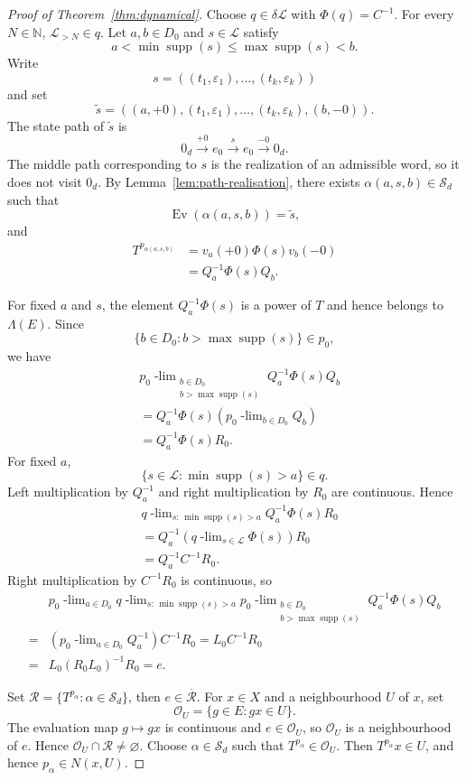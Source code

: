 \documentclass[10pt,a4paper]{amsart}
\newcommand{\N}{\mathbb N}
\newcommand{\Sd}{\mathcal S_d}
\newcommand{\cL}{\mathcal L}
\newcommand{\supp}{\operatorname{supp}}
\newcommand{\ulim}[2]{#1\!\operatorname{-lim}_{#2}}
\begin{document}
\begin{proof}[Proof of Theorem~\ref{thm:dynamical}]
Choose $q\in\delta\cL$ with $\Phi(q)=C^{-1}$.
For every $N\in\N$, $\cL_{>N}\in q$.
Let $a,b\in D_0$ and $s\in\cL$ satisfy
\[
 a<\min\supp(s)\leq\max\supp(s)<b.
\]
Write  
\[
 s=((t_1,\varepsilon_1),\ldots,(t_k,\varepsilon_k))
\]
and set
\[
 \widetilde s
 =((a,+0),(t_1,\varepsilon_1),\ldots,(t_k,\varepsilon_k),(b,-0)).
\]
The state path of $\widetilde s$ is
\[
 0_d \xrightarrow{+0} e_0 \xrightarrow{s} e_0\xrightarrow{-0} 0_d.
\]
The middle path corresponding to $s$ is the realization of an admissible word, so it does not visit $0_d$.
By Lemma~\ref{lem:path-realisation}, there exists $ \alpha(a,s,b) \in \Sd$  such that 
\[
 \operatorname{Ev}( \alpha(a,s,b))=\widetilde s,
\]
and
\[
 \begin{aligned}
 T^{p_{ \alpha(a,s,b) }}
 &=v_a(+0)\Phi(s)v_b(-0)\\
 &=Q_a^{-1}\Phi(s)Q_b.
\end{aligned}   
\]
 

For fixed $a$ and $s$, the element $Q_a^{-1}\Phi(s)$ is a power of $T$ and  hence belongs to $\Lambda(E)$.  Since
\[
 \{b\in D_0:b>\max\supp(s)\}\in p_0,
\]
we have
\[
\begin{aligned}
 &\ulim{  p_0}
      {\substack{b\in D_0\\b>\max\supp(s)}}
 Q_a^{-1}\Phi(s)Q_b\\
 & =Q_a^{-1}\Phi(s)
   \left(\ulim{  p_0}{b\in D_0}Q_b\right)\\
 &=Q_a^{-1}\Phi(s)R_0.
\end{aligned}
\]
For fixed $a$,
\[
 \{s\in\cL:\min\supp(s)>a\}\in q.
\]
Left multiplication by $Q_a^{-1}$ and right multiplication by $R_0$ are continuous.  Hence
\[
\begin{aligned}
 &\ulim{q}{s:\,\min\supp(s)>a}
 Q_a^{-1}\Phi(s)R_0\\
 & =Q_a^{-1}
   \left(\ulim{q}{s\in\cL}\Phi(s)\right)R_0\\
 & =Q_a^{-1}C^{-1}R_0.
\end{aligned}
\]
Right multiplication by $C^{-1}R_0$ is continuous, so
\[
 \begin{aligned}
 &\ulim{  p_0}{a\in D_0}
  \ulim{q}{s:\,\min\supp(s)>a}
  \ulim{ p_0}
       {\substack{b\in D_0\\b>\max\supp(s)}}
 Q_a^{-1}\Phi(s)Q_b\\
  = & \left(\ulim{ p_0}{a\in D_0}Q_a^{-1}\right)C^{-1}R_0 
  = L_0C^{-1}R_0 \\
  =&L_0(R_0L_0)^{-1}R_0 =e.
\end{aligned}   
\]
 
Set $\mathcal R=\{T^{p_\alpha}:\alpha\in\Sd\}$, then $e\in\overline{\mathcal R}$.
For $x\in X$ and a neighbourhood $U$ of $x$, set
\[
 \mathcal O_U=\{g\in E:gx\in U\}.
\]
The evaluation map $g\mapsto gx$ is continuous and $e\in\mathcal O_U$, so
$\mathcal O_U$ is a neighbourhood of $e$.  Hence $\mathcal O_U\cap\mathcal R\neq\varnothing$.
Choose $\alpha\in\Sd$ such that
$T^{p_\alpha}\in\mathcal O_U$.  Then $T^{p_\alpha}x\in U$,
and hence $p_\alpha\in N(x,U)$.
 

\end{proof}
\end{document}
